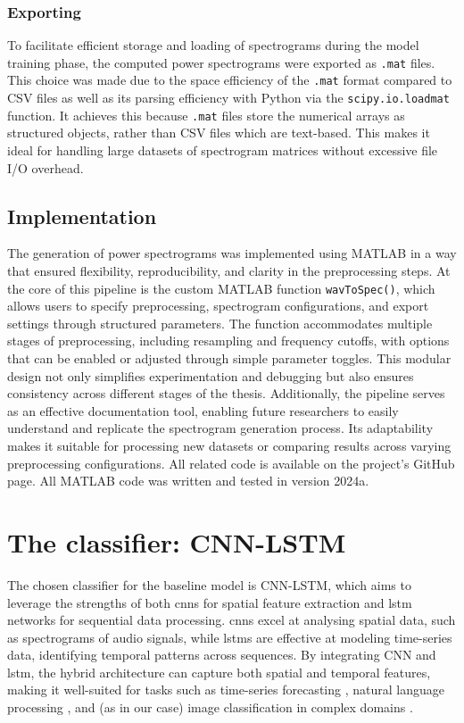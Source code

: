 \subsubsection{Exporting}

To facilitate efficient storage and loading of spectrograms during the model training phase, the computed power spectrograms were exported as \texttt{.mat} files. This choice was made due to the space efficiency of the \texttt{.mat} format compared to CSV files as well as its parsing efficiency with Python via the \texttt{scipy.io.loadmat} function. It achieves this because \texttt{.mat} files store the numerical arrays as structured objects, rather than CSV files which are text-based. This makes it ideal for handling large datasets of spectrogram matrices without excessive file I/O overhead. 

\subsection{Implementation}

The generation of power spectrograms was implemented using MATLAB in a way that ensured flexibility, reproducibility, and clarity in the preprocessing steps. At the core of this pipeline is the custom MATLAB function \texttt{wavToSpec()}, which allows users to specify preprocessing, spectrogram configurations, and export settings through structured parameters. The function accommodates multiple stages of preprocessing, including resampling and frequency cutoffs, with options that can be enabled or adjusted through simple parameter toggles. This modular design not only simplifies experimentation and debugging but also ensures consistency across different stages of the thesis. Additionally, the pipeline serves as an effective documentation tool, enabling future researchers to easily understand and replicate the spectrogram generation process. Its adaptability makes it suitable for processing new datasets or comparing results across varying preprocessing configurations. All related code is available on the project's GitHub page. All MATLAB code was written and tested in version 2024a.

\section{The classifier: CNN-LSTM}

The chosen classifier for the baseline model is CNN-LSTM, which aims to leverage the strengths of both \acrshort{cnn}s for spatial feature extraction and \acrshort{lstm} networks for sequential data processing. \acrshort{cnn}s excel at analysing spatial data, such as spectrograms of audio signals, while \acrshort{lstm}s are effective at modeling time-series data, identifying temporal patterns across sequences. By integrating CNN and \acrshort{lstm}, the hybrid architecture can capture both spatial and temporal features, making it well-suited for tasks such as time-series forecasting \cite{kim_predicting_2019, lu_cnn-lstm-based_2020}, natural language processing \cite{wang_dimensional_2016, umer_fake_2020}, and (as in our case) image classification in complex domains \cite{vankdothu_brain_2022, islam_combined_2020}. 

